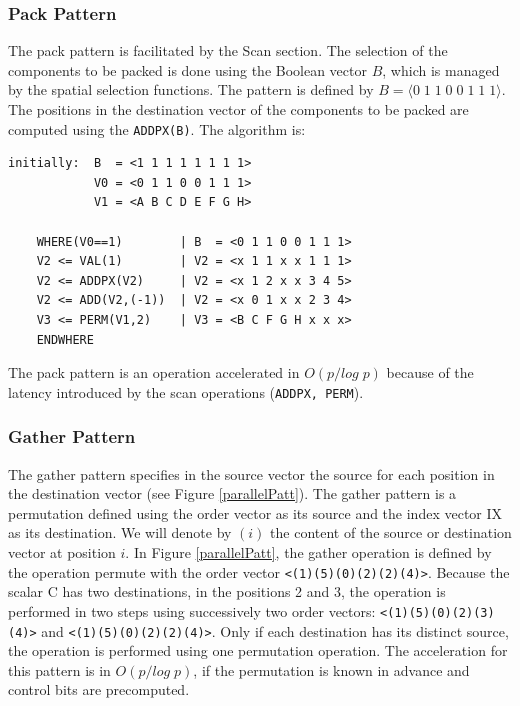 \subsubsection{Pack Pattern}

The pack pattern is facilitated by the Scan section. The selection of the components to be packed is done using the Boolean vector $B$, which is managed by the spatial selection functions. The pattern is defined by  $B = \langle 0 \; 1\; 1\; 0\; 0\; 1\; 1\; 1 \rangle$. The positions in the destination vector of the components to be packed   are computed using the {\tt ADDPX(B)}. The algorithm is:
\begin{verbatim}
initially:  B  = <1 1 1 1 1 1 1 1>
            V0 = <0 1 1 0 0 1 1 1>
            V1 = <A B C D E F G H>

    WHERE(V0==1)        | B  = <0 1 1 0 0 1 1 1>
    V2 <= VAL(1)        | V2 = <x 1 1 x x 1 1 1>
    V2 <= ADDPX(V2)     | V2 = <x 1 2 x x 3 4 5>
    V2 <= ADD(V2,(-1))  | V2 = <x 0 1 x x 2 3 4>
    V3 <= PERM(V1,2)    | V3 = <B C F G H x x x>
    ENDWHERE
\end{verbatim}

The pack pattern is an operation accelerated in $O(p/log \; p)$ because of the latency introduced by the scan operations ({\tt ADDPX, PERM}).

\subsubsection{Gather Pattern}

The gather pattern specifies in the source vector the source for each position in the destination vector (see Figure \ref{parallelPatt}). The gather pattern is a permutation defined using the order vector as its source and the index vector IX as its destination. We will denote by $(i)$ the content of the source or destination vector at position $i$.
In Figure \ref{parallelPatt}, the gather operation is defined by the operation permute with the order vector {\tt <(1)(5)(0)(2)(2)(4)>}.
Because the scalar C has two destinations, in the positions 2 and 3, the operation is performed in two steps using successively two order vectors: {\tt <(1)(5)(0)(2)(3)(4)>} and {\tt <(1)(5)(0)(2)(2)(4)>}.
Only if each destination has its distinct source, the operation is performed using one permutation operation. The acceleration for this pattern is in $O(p / log \; p)$, if the permutation is known in advance and control bits are precomputed.

